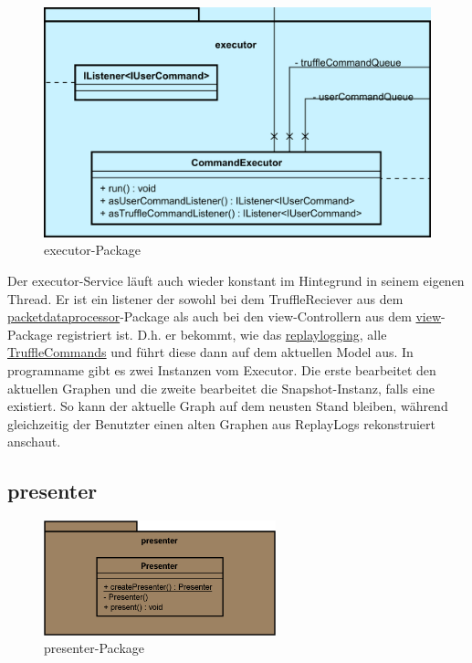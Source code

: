     \begin{figure}[H]
      \centering
      \includegraphics[width=\textwidth]{../diagramimages/executor.png}
      \caption{executor-Package}
    \end{figure}

    \medskip
    Der executor-Service läuft auch wieder konstant im Hintegrund in seinem
    eigenen Thread. Er ist ein \gls{listener} der sowohl bei dem TruffleReciever aus dem
    \hyperref[subsubsec:packetdataprocessor]{packetdataprocessor}-Package als
    auch bei den view-Controllern aus dem \hyperref[subsec:view]{view}-Package
    registriert ist. D.h. er bekommt, wie das \hyperref[subsubsec:replaylogging]{replaylogging},
    alle \hyperref[subsubsec:trufflecommand]{TruffleCommands} und führt diese
    dann auf dem aktuellen Model aus.
    \newline
    \newline
    In \gls{programname} gibt es zwei Instanzen vom Executor. Die erste bearbeitet
    den aktuellen Graphen und die zweite bearbeitet die Snapshot-Instanz, falls
    eine existiert. So kann der aktuelle Graph auf dem neusten Stand bleiben, während
    gleichzeitig der Benutzter einen alten Graphen aus
    ReplayLogs rekonstruiert anschaut.


\subsection{presenter}
\label{subsec:presenter}

\begin{figure}[H]
  \centering
  \includegraphics[width=0.6\textwidth]{../diagramimages/presenter.png}
  \caption{presenter-Package}
\end{figure}

